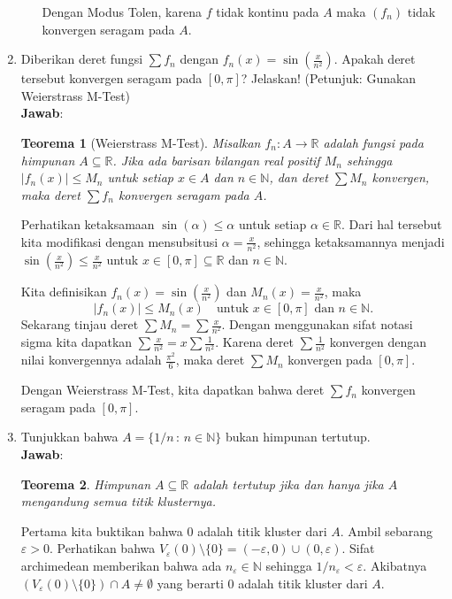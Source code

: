 \documentclass[12pt,openany,a4paper]{article}
\newtheorem*{teorema}{Teorema}
\newcommand{\R}{\mathbb{R}}
\newcommand{\N}{\mathbb{N}}
\newcommand{\jawab}{\textbf{Jawab}:}
\begin{document}
\begin{enumerate}
\begin{enumerate}
            Dengan Modus Tolen, karena $f$ tidak kontinu pada $A$ maka $(f_n)$ tidak konvergen seragam pada $A$.
    \end{enumerate}
    \item Diberikan deret fungsi $\sum f_n$ dengan $f_n(x)=\sin(\frac{x}{n^2})$. Apakah deret 
    tersebut konvergen seragam pada $[0,\pi]$? Jelaskan! (Petunjuk: Gunakan Weierstrass M-Test)\\
    \jawab
    \begin{teorema}[Weierstrass M-Test]
        Misalkan $f_n : A \to \R$ adalah fungsi pada himpunan $A \subseteq \R$. Jika ada barisan 
        bilangan real positif $M_n$ sehingga $|f_n(x)| \leq M_n$ untuk setiap $x \in A$ dan $n \in \N$, 
        dan deret $\sum M_n$ konvergen, maka deret $\sum f_n$ konvergen seragam pada $A$.
    \end{teorema}
    Perhatikan ketaksamaan $\sin(\alpha)\leq \alpha$ untuk setiap $\alpha\in\R$. Dari hal tersebut 
    kita modifikasi dengan mensubsitusi $\alpha=\frac{x}{n^2}$, sehingga ketaksamannya menjadi 
    $\sin\left(\frac{x}{n^2}\right)\leq \frac{x}{n^2}$ untuk $x\in[0,\pi]\subseteq\R$ dan $n\in\N$.

    Kita definisikan $f_n(x)=\sin\left(\frac{x}{n^2}\right)$ dan $M_n(x)=\frac{x}{n^2}$, maka
    \[|f_n(x)|\leq M_n(x)\quad\text{untuk }x\in[0,\pi]\text{ dan }n\in\N.\]
    Sekarang tinjau deret $\sum M_n=\sum\frac{x}{n^2}$. Dengan menggunakan sifat notasi sigma
    kita dapatkan $\sum\frac{x}{n^2}=x\sum\frac{1}{n^2}$. Karena deret $\sum\frac{1}{n^2}$ konvergen 
    dengan nilai konvergennya adalah $\frac{\pi^2}{6}$, maka deret $\sum M_n$ konvergen pada $[0,\pi]$.

    Dengan Weierstrass M-Test, kita dapatkan bahwa deret $\sum f_n$ konvergen seragam pada $[0,\pi]$.

    \item Tunjukkan bahwa $A=\{1/n\,:\,n\in \N\}$ bukan himpunan tertutup.\\
    \jawab
    \begin{teorema}
        Himpunan $A\subseteq\R$ adalah tertutup jika dan hanya jika $A$ mengandung semua titik klusternya.
    \end{teorema}
    Pertama kita buktikan bahwa $0$ adalah titik kluster dari $A$. Ambil
    sebarang $\varepsilon > 0$. Perhatikan bahwa $V_\varepsilon(0)\setminus \{0\} = (-\varepsilon, 0)\cup(0, \varepsilon)$.
    Sifat archimedean memberikan bahwa ada $n_\varepsilon\in\N$ sehingga $1/n_\varepsilon<\varepsilon$. 
    Akibatnya $(V_\varepsilon(0)\setminus \{0\})\cap A\ne \emptyset$ yang berarti $0$ adalah titik kluster dari $A$.


\end{enumerate}
\end{document}
